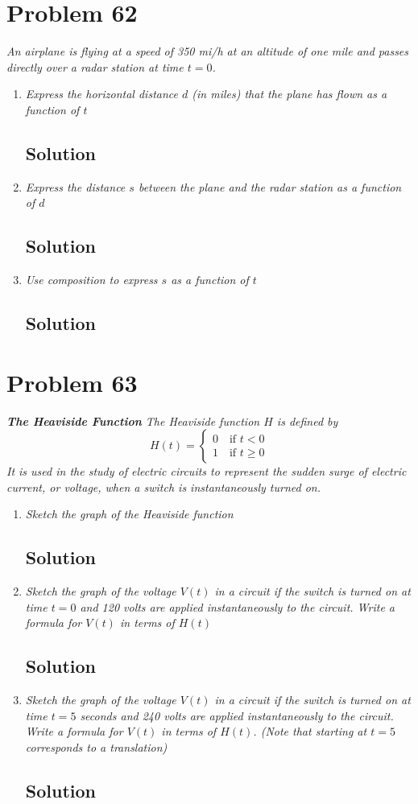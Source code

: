 \documentclass[11pt]{article}
\newcommand{\soln}{\subsection*}
\newcommand{\qn}{\textit}
\begin{document}
\section*{Problem 62}

\qn{An airplane is flying at a speed of 350 mi/h at an altitude of one mile and passes directly over a radar station at time $t=0$.}

\begin{enumerate}
	\item \qn{Express the horizontal distance $d$ (in miles) that the plane has flown as a function of $t$}
	\soln{Solution}
	
	\item \qn{Express the distance $s$ between the plane and the radar station as a function of $d$}
	\soln{Solution}
	
	\item \qn{Use composition to express $s$ as a function of $t$}
	\soln{Solution}
\end{enumerate}

\section*{Problem 63}

\qn{\textbf{The Heaviside Function} The Heaviside function $H$ is defined by $$H(t)=\begin{cases} 0 \quad\text{if }t<0 \\ 1 \quad\text{if }t \ge 0\end{cases}$$ It is used in the study of electric circuits to represent the sudden surge of electric current, or voltage, when a switch is
instantaneously turned on.}

\begin{enumerate}
	\item \qn{Sketch the graph of the Heaviside function}
	\soln{Solution}
	
	\item \qn{Sketch the graph of the voltage $V(t)$ in a circuit if the switch is turned on at time $t=0$ and 120 volts are applied instantaneously to the circuit. Write a formula for $V(t)$ in terms of $H(t)$}
	\soln{Solution}
	
	\item \qn{Sketch the graph of the voltage $V(t)$ in a circuit if the switch is turned on at time $t=5$ seconds and 240 volts are applied instantaneously to the circuit. Write a formula for $V(t)$ in terms of $H(t)$. (Note that starting at $t=5$ corresponds to a translation)}
	\soln{Solution}
\end{enumerate}
\end{document}
